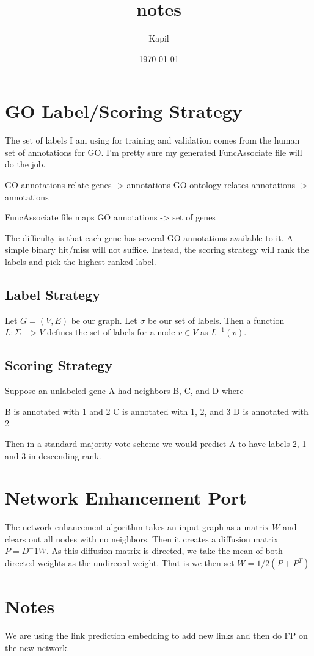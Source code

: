 \documentclass[11pt]{article}
\author{Kapil}
\date{\today}
\title{notes}
\begin{document}
\maketitle
\tableofcontents

\section{GO Label/Scoring Strategy}
\label{sec-1}
The set of labels I am using for training and validation comes from
the human set of annotations for GO. I'm pretty sure my generated
FuncAssociate file will do the job.

GO annotations relate genes -> annotations
GO ontology relates annotations -> annotations

FuncAssociate file maps GO annotations -> set of genes 

The difficulty is that each gene has several GO annotations available
to it. A simple binary hit/miss will not suffice. Instead, the scoring
strategy will rank the labels and pick the highest ranked label.

\subsection{Label Strategy}
\label{sec-1-1}
Let $G = (V, E)$ be our graph. Let $\sigma$ be our set of labels. Then
a function $L : \Sigma -> V$ defines the set of labels for a node
$v \in V$ as $L^{-1}(v)$.

\subsection{Scoring Strategy}
\label{sec-1-2}
Suppose an unlabeled gene A had neighbors B, C, and D where

B is annotated with 1 and 2
C is annotated with 1, 2, and 3
D is annotated with 2

Then in a standard majority vote scheme we would predict A to have
labels 2, 1 and 3 in descending rank.

\section{Network Enhancement Port}
\label{sec-2}
The network enhancement algorithm takes an input graph as a matrix
$W$ and clears out all nodes with no neighbors. Then it creates a
diffusion matrix $P = D^-1W$. As this diffusion matrix is directed, we
take the mean of both directed weights as the undireced weight. That
is we then set $W = 1/2(P + P^T)$
\section{Notes}
\label{sec-3}
We are using the link prediction embedding to add new links and then
do FP on the new network.
\end{document}

